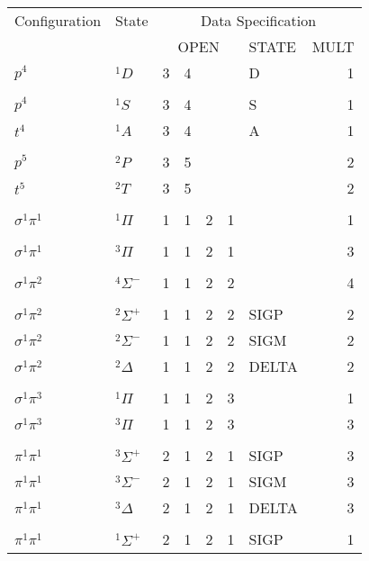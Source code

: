 \documentclass[11pt,fleqn]{article}
\begin{document}
\begin{table}
 \begin{centering}
 \begin{tabular}{lllllllr}
 \\ \hline \hline
Configuration &  State   & \multicolumn{6}{c}{Data Specification}\\
         \cline{3-8}
   & & \multicolumn{4}{c}{OPEN} & STATE  & MULT   \\ \cline{3-8}
 $p^{4}$   & $^{1}D$   &   3 & 4 & &   & D &  1 \\
\\
 $p^{4}$   & $^{1}S$   &   3 & 4 & &   & S &  1 \\
 $t^{4}$   & $^{1}A$   &   3 & 4 & &   & A &  1 \\
\\
 $p^{5}$   & $^{2}P$   &   3 & 5 & &   &  &  2 \\
 $t^{5}$   & $^{2}T$   &   3 & 5 & &   &  &  2 \\
\\
 $\sigma^{1}\pi^{1}$   & $^{1}\Pi$   &  1 &  1 &  2 &  1  &  &  1 \\
\\
 $\sigma^{1}\pi^{1}$   & $^{3}\Pi$   &  1 &  1 &  2 &  1  &  &  3 \\
\\
 $\sigma^{1}\pi^{2}$   & $^{4}\Sigma^{-}$   & 1 &  1 &  2 &  2  &  &  4 \\
\\
 $\sigma^{1}\pi^{2}$   & $^{2}\Sigma^{+}$   & 1  & 1  & 2  & 2  & SIGP  &  2 \\
 $\sigma^{1}\pi^{2}$   & $^{2}\Sigma^{-}$   &  1  & 1 & 2  & 2  & SIGM  &  2 \\
 $\sigma^{1}\pi^{2}$   & $^{2}\Delta$   &  1 & 1 & 2 & 2  & DELTA  &  2 \\
\\
 $\sigma^{1}\pi^{3}$   & $^{1}\Pi$   &  1 & 1 & 2 & 3  &   &  1 \\
 $\sigma^{1}\pi^{3}$   & $^{3}\Pi$   &  1 & 1 & 2 & 3  &   &  3 \\
\\
 $\pi^{1}\pi^{1}$   & $^{3}\Sigma^{+}$   &  2 & 1 & 2 & 1 & SIGP  &  3 \\
 $\pi^{1}\pi^{1}$   & $^{3}\Sigma^{-}$   &  2 & 1 & 2 & 1 & SIGM  &  3 \\
 $\pi^{1}\pi^{1}$   & $^{3}\Delta$   &  2 & 1 & 2 & 1 & DELTA  &  3 \\
\\
 $\pi^{1}\pi^{1}$   & $^{1}\Sigma^{+}$   &  2 & 1 & 2 & 1 & SIGP  &  1 \\

\end{tabular}
\end{centering}
\end{table}
\end{document}

